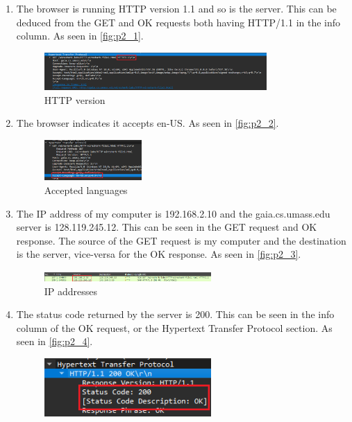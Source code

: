 \documentclass{article}
\begin{document}
\begin{enumerate}
    \item The browser is running HTTP version 1.1 and so is the server. This can be deduced from the GET and OK requests both having HTTP/1.1 in the info column. As seen in \autoref{fig:p2_1}.
    \begin{figure}[ht!]
        \centering
        \includegraphics[width=0.8\textwidth]{p2_1}
        \caption{HTTP version}
        \label{fig:p2_1}
    \end{figure}
    \item The browser indicates it accepts en-US. As seen in \autoref{fig:p2_2}.
    \begin{figure}[ht!]
        \centering
        \includegraphics[width=0.35\textwidth]{p2_2}
        \caption{Accepted languages}
        \label{fig:p2_2}
    \end{figure}
    \newpage
    \item The IP address of my computer is 192.168.2.10 and the gaia.cs.umass.edu server is 128.119.245.12. This can be seen in the GET request and OK response. The source of the GET request is my computer and the destination is the server, vice-versa for the OK response. As seen in \autoref{fig:p2_3}.
    \begin{figure}[ht!]
        \centering
        \includegraphics[width=0.6\textwidth]{p2_3}
        \caption{IP addresses}
        \label{fig:p2_3}
    \end{figure}
    \item The status code returned by the server is 200. This can be seen in the info column of the OK request, or the Hypertext Transfer Protocol section. As seen in \autoref{fig:p2_4}.
    \begin{figure}[ht!]
        \centering
        \includegraphics[width=0.6\textwidth]{p2_4}

\end{figure}
\end{enumerate}
\end{document}
